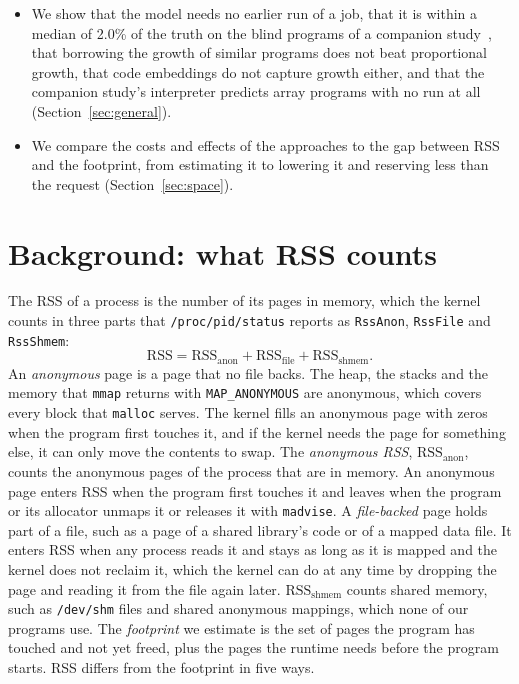 \documentclass[11pt]{article}
\newcommand{\secref}[1]{Section~\ref{#1}}
\newcommand{\term}[1]{\emph{#1}}
\begin{document}
\begin{itemize}
reservations (\secref{sec:place}).
\item We show that the model needs no earlier run of a job, that it is within a median of 2.0\% of the truth on the
blind programs of a companion study~\cite{memprintstatic}, that borrowing the growth of similar programs does not
beat proportional growth, that code embeddings do not capture growth either, and that the companion study's
interpreter predicts array programs with no run at all
(\secref{sec:general}).
\item We compare the costs and effects of the approaches to the gap between RSS and the footprint, from estimating it
to lowering it and reserving less than the request (\secref{sec:space}).
\end{itemize}

\section{Background: what RSS counts}
\label{sec:background}

The RSS of a process is the number of its pages in memory, which the kernel counts in three parts that
\texttt{/proc/pid/status} reports as \texttt{RssAnon}, \texttt{RssFile} and \texttt{RssShmem}:
\begin{equation}
\mathrm{RSS} = \mathrm{RSS}_{\mathrm{anon}} + \mathrm{RSS}_{\mathrm{file}} + \mathrm{RSS}_{\mathrm{shmem}} .
\end{equation}
An \term{anonymous} page is a page that no file backs. The heap, the stacks and the memory that \texttt{mmap} returns
with \texttt{MAP\_ANONYMOUS} are anonymous, which covers every block that \texttt{malloc} serves. The kernel fills an
anonymous page with zeros when the program first touches it, and if the kernel needs the page for something else, it
can only move the contents to swap. The \term{anonymous RSS}, $\mathrm{RSS}_{\mathrm{anon}}$, counts the anonymous pages
of the process that are in memory. An anonymous page enters RSS when the program first touches it and leaves when the
program or its allocator unmaps it or releases it with \texttt{madvise}. A \term{file-backed} page holds part of a
file, such as a page of a shared library's code or of a mapped data file. It enters RSS when any process reads it and
stays as long as it is mapped and the kernel does not reclaim it, which the kernel can do at any time by dropping the
page and reading it from the file again later. $\mathrm{RSS}_{\mathrm{shmem}}$ counts shared memory, such as
\texttt{/dev/shm} files and shared anonymous mappings, which none of our programs use. The \term{footprint} we estimate is the set of
pages the program has touched and not yet freed, plus the pages the runtime needs before the program starts. RSS
differs from the footprint in five ways.
\end{document}
